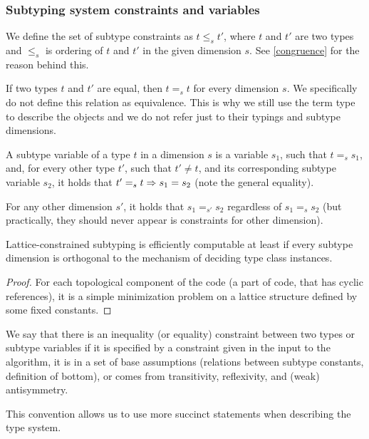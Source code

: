 \subsubsection{Subtyping system constraints and variables}

\begin{defn}
    We define the set of subtype constraints as $t \leq_s t'$, where $t$ and $t'$ are two types and $\leq_s$ is ordering of $t$ and $t'$ in the given dimension $s$. See \cref{congruence} for the reason behind this.
\end{defn}

\begin{defn}
    If two types $t$ and $t'$ are equal, then $t =_s t$ for every dimension $s$. We specifically do not define this relation as equivalence. This is why we still use the term type to describe the objects and we do not refer just to their typings and subtype dimensions.
\end{defn}

\begin{defn}
    A subtype variable of a type $t$ in a dimension $s$  is a variable $s_1$, such that $t =_s s_1$, and, for every other type $t'$, such that $t' \neq t$, and its corresponding subtype variable $s_2$, it holds that $t' =_s t \Rightarrow s_1 = s_2$ (note the general equality).

    For any other dimension $s'$, it holds that $s_1 =_{s'} s_2$ regardless of $s_1 =_s s_2$ (but practically, they should never appear is constraints for other dimension).
\end{defn}

\begin{lemma}
    Lattice-constrained subtyping is efficiently computable at least if every subtype dimension is orthogonal to the mechanism of deciding type class instances.
\end{lemma}

\begin{proof}
    For each topological component of the code (a part of code, that has cyclic references), it is a simple minimization problem on a lattice structure defined by some fixed constants.
\end{proof}

\begin{defn}
    We say that there is an inequality (or equality) constraint between two types or subtype variables if it is specified by a constraint given in the input to the algorithm, it is in a set of base assumptions (relations between subtype constants, definition of bottom), or comes from transitivity, reflexivity, and (weak) antisymmetry.

    This convention allows us to use more succinct statements when describing the type system.
\end{defn}

